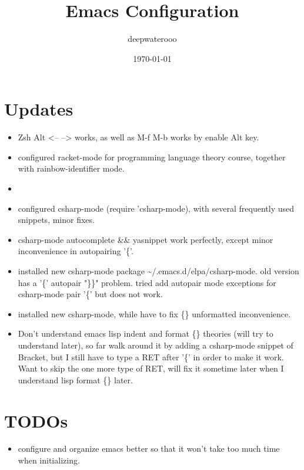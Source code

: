 \documentclass[9pt,b5paper]{article}
\author{deepwaterooo}
\date{\today}
\title{Emacs Configuration}
\begin{document}
\maketitle
\tableofcontents


\section{Updates}
\label{sec-1}
\begin{itemize}
\item Zsh Alt <-- --> works, as well as M-f M-b works by enable Alt key.
\item configured racket-mode for programming language theory course, together with rainbow-identifier mode.
\item 
\item configured csharp-mode (require 'csharp-mode), with several frequently used snippets, minor fixes.
\item csharp-mode autocomplete \&\& yasnippet work perfectly, except minor inconvenience in autopairing '\{'.
\item installed new csharp-mode package \textasciitilde{}/.emacs.d/elpa/csharp-mode. old version has a '\{' autopair "\}\}" problem. tried add autopair mode exceptions for csharp-mode pair '\{' but does not work.
\item installed new csharp-mode, while have to fix \{\} unformatted inconvenience.
\item Don't understand emacs lisp indent and format \{\} theories (will try to understand later), so far walk around it by adding a csharp-mode snippet of Bracket, but I still have to type a RET after '\{' in order to make it work. Want to skip the one more type of RET, will fix it sometime later when I understand lisp format \{\} later.
\end{itemize}

\section{TODOs}
\label{sec-2}
\begin{itemize}
\item configure and organize emacs better so that it won't take too much time when initializing.
\end{itemize}
\end{document}
